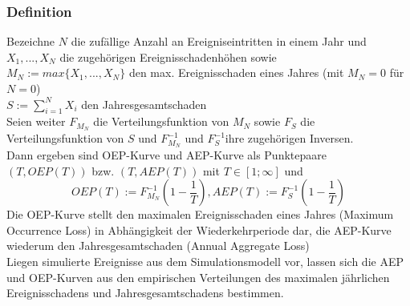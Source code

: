 \documentclass[12pt]{report}
\theoremstyle{dotless}
\theoremstyle{definition}
\begin{document}
\subsubsection{Definition}
Bezeichne $N$ die zufällige Anzahl an Ereigniseintritten in einem Jahr und $X_1, ..., X_N$ die zugehörigen Ereignisschadenhöhen sowie\\
$M_N:= max{\{ X_1, ..., X_N\}}$ den max. Ereignisschaden eines Jahres (mit $M_N=0$ für $N=0$)\\
$S:= \sum^N_{i=1} X_i$ den Jahresgesamtschaden \\
Seien weiter $F_{M_N}$ die Verteilungsfunktion von $M_N$ sowie $F_S$ die Verteilungsfunktion von $S$ und $F^{-1}_{M_N}$ und $F^{-1}_S$ihre zugehörigen Inversen. \\
Dann ergeben sind OEP-Kurve und AEP-Kurve als Punktepaare $(T, OEP(T))$ bzw. $(T, AEP(T))$ mit $T \in [1;\infty ]$ und
\begin{equation}
OEP(T) := F^{-1}_{M_N} \left( 1- \frac{1}{T} \right) , AEP(T):= F^{-1}_S \left( 1- \frac{1}{T} \right)
\end{equation}
Die OEP-Kurve stellt den maximalen Ereignisschaden eines Jahres (Maximum Occurrence Loss) in
Abhängigkeit der Wiederkehrperiode dar, die AEP-Kurve wiederum den Jahresgesamtschaden (Annual
Aggregate Loss) \\

Liegen simulierte Ereignisse aus dem Simulationsmodell vor, lassen sich die AEP und OEP-Kurven
aus den empirischen Verteilungen des maximalen jährlichen Ereignisschadens und
Jahresgesamtschadens bestimmen. 
\end{document}
